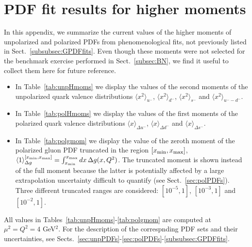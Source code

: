 \section{PDF fit results for higher moments }
\label{app:Hmoms}

In this appendix, we summarize the current values of the higher moments of 
unpolarized and polarized PDFs from phenomenological fits, not previously 
listed in Sect.~\ref{subsubsec:GPDFfits}.
%
Even though these moments were not selected for the benchmark exercise 
performed in Sect.~\ref{subsec:BN}, we find it useful to collect them 
here for future reference.

\begin{itemize}

\item In Table~\ref{tab:unpHmoms} we display the values of the second moments 
of the unpolarized quark valence distributions $\langle x^2\rangle_{u^-}$, 
$\langle x^2\rangle_{d^-}$, $\langle x^2\rangle_{s^-}$ and 
$\langle x^2\rangle_{u^--d^-}$.

\item In Table~\ref{tab:polHmoms} we display the values of the first moments 
of the polarized quark valence distributions $\langle x\rangle_{\Delta u^-}$, 
$\langle x\rangle_{\Delta d^-}$ and $\langle x\rangle_{\Delta s^-}$.

\item In Table~\ref{tab:polgmom} we display the value of the zeroth moment
of the polarized gluon PDF truncated in the region $[x_{\rm min}, x_{\rm max}]$,
$\langle 1\rangle_{\Delta g}^{[x_{\rm min}, x_{\rm max}]}=\int_{x_{\rm min}}^{x_{\rm max}}dx\,\Delta g(x,Q^2)$.
%
The truncated moment is shown instead of the full moment
because the latter is potentially affected by a large extrapolation 
uncertainty difficult to quantify (see Sect.~\ref{sec:polPDFs}). 
%
Three different truncated ranges are considered: $[10^{-5},1]$,  $[10^{-3},1]$
and  $[10^{-2},1]$.

\end{itemize}
%
All values in Tables~\ref{tab:unpHmoms}-\ref{tab:polgmom} are computed at 
$\mu^2=Q^2=4$ GeV$^2$.
%
For the description of the correspnding PDF sets and their uncertainties, see
Sects.~\ref{sec:unpPDFs}-\ref{sec:polPDFs}-\ref{subsubsec:GPDFfits}.


